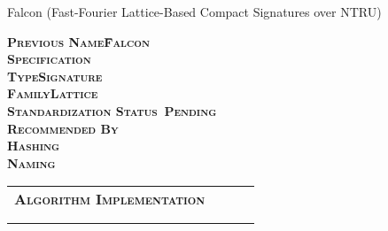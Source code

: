 \documentclass[11pt,english,a4paper, landscape]{scrartcl}
\begin{document}
	\begin{algorithmbox}{Falcon (Fast-Fourier Lattice-Based Compact Signatures over NTRU)}
		\begin{minipage}[t]{0.35\textwidth}
			\scriptsize
			\begin{center}
			\end{center}

			\begin{tabbing}
				\bfseries \scshape Previous Name\hspace{2.5cm}\=Falcon\\
				\bfseries \scshape Specification\>\\
				\bfseries \scshape Type\>Signature\\
				\bfseries \scshape Family\>Lattice\\
				\bfseries \scshape Standardization Status\>\faCalendar\, Pending\\
				\bfseries \scshape Recommended By\>\tbd\\
				\bfseries \scshape Hashing\>\tbd\\
				\bfseries \scshape Naming\>\tbd
			\end{tabbing}
			\begin{tabular}[t]{l c  c  c}
				\scshape\bfseries Algorithm Implementation &\textcolor{themegreydark}{\faKey}&\textcolor{themegreydark}{\faPen}&\textcolor{themegreydark}{\faQuestionCircle}\\
				&&&\\
				\hline\\



\end{tabular}
\end{minipage}
\end{algorithmbox}
\end{document}
